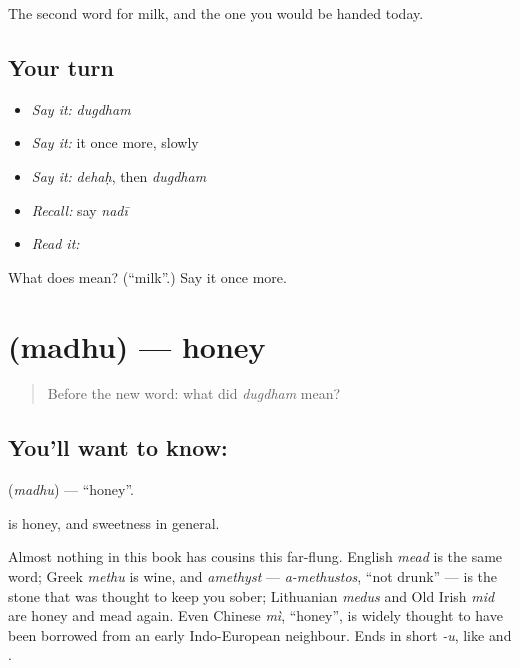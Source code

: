\begin{grammarlens}[title={What you've built}]
The second word for milk, and the one you would be handed today.
\end{grammarlens}

\subsection*{Your turn}
\begin{itemize}
\raggedright
  \item \emph{Say it:} \emph{dugdham}
  \item \emph{Say it:} it once more, slowly
  \item \emph{Say it:} \emph{dehaḥ}, then \emph{dugdham}
  \item \emph{Recall:} say \emph{nadī}
  \item \emph{Read it:} \textbf{}
\end{itemize}

\begin{tcolorbox}[breakable,colback=teal!4,colframe=teal!35!black,title={Before you move on}]
What does  mean? (\textquotedblleft{}milk\textquotedblright{}.) Say it once more.
\end{tcolorbox}
\section[\texorpdfstring{\sk{मधु} (madhu)}{मधु (madhu)}]{ (madhu) — honey}

\label{lesson:SA-C35-honey}



\begin{quote}
Before the new word: what did \emph{dugdham} mean?
\end{quote}

\subsection*{You'll want to know: }
\textbf{} (\emph{madhu}) — \textquotedblleft{}honey\textquotedblright{}.

\textbf{} is honey, and sweetness in general.

Almost nothing in this book has cousins this far-flung. English \emph{mead} is the same word; Greek \emph{methu} is wine, and \emph{amethyst} — \emph{a-methustos}, \textquotedblleft{}not drunk\textquotedblright{} — is the stone that was thought to keep you sober; Lithuanian \emph{medus} and Old Irish \emph{mid} are honey and mead again. Even Chinese \emph{mì}, \textquotedblleft{}honey\textquotedblright{}, is widely thought to have been borrowed from an early Indo-European neighbour. Ends in short \emph{-u}, like \textbf{} and \textbf{}.

